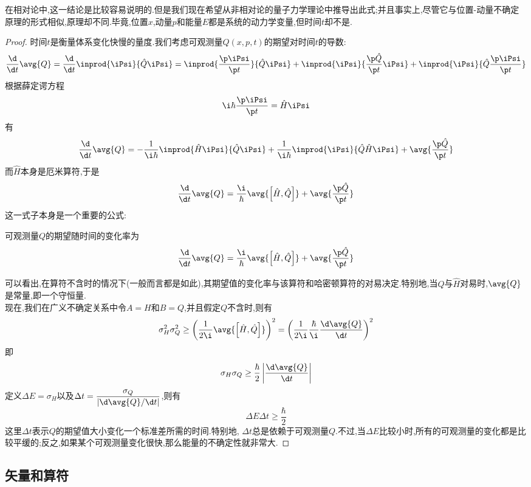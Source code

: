 \documentclass{ctexart}
\begin{document}
在相对论中,这一结论是比较容易说明的.但是我们现在希望从非相对论的量子力学理论中推导出此式;并且事实上,尽管它与位置-动量不确定原理的形式相似,原理却不同.毕竟,位置$x$,动量$p$和能量$E$都是系统的动力学变量,但时间$t$却不是.
\begin{proof}
    时间$t$是衡量体系变化快慢的量度.我们考虑可观测量$Q(x,p,t)$的期望对时间$t$的导数:
    \[\dfrac{\d}{\d t}\avg{Q}=\dfrac{\d}{\d t}\inprod{\iPsi}{\hat{Q}\iPsi}=\inprod{\dfrac{\p\iPsi}{\p t}}{\hat{Q}\iPsi}+\inprod{\iPsi}{\dfrac{\p\hat{Q}}{\p t}\iPsi}+\inprod{\iPsi}{\hat{Q}\dfrac{\p\iPsi}{\p t}}\]
    根据薛定谔方程
    \[\i\hbar\dfrac{\p\iPsi}{\p t}=\hat{H}\iPsi\]
    有
    \[\dfrac{\d}{\d t}\avg{Q}=-\dfrac{1}{\i\hbar}\inprod{\hat{H}\iPsi}{\hat{Q}\iPsi}+\dfrac{1}{\i\hbar}\inprod{\iPsi}{\hat{Q}\hat{H}\iPsi}+\avg{\dfrac{\p\hat{Q}}{\p t}}\]
    而$\hat{H}$本身是厄米算符,于是
    \[\dfrac{\d}{\d t}\avg{Q}=\dfrac{\i}{\hbar}\avg{\left[\hat{H},\hat{Q}\right]}+\avg{\dfrac{\p\hat{Q}}{\p t}}\]
    这一式子本身是一个重要的公式:
    \begin{theorem}[广义埃伦菲斯特定理]
        可观测量$Q$的期望随时间的变化率为
        \[\dfrac{\d}{\d t}\avg{Q}=\dfrac{\i}{\hbar}\avg{\left[\hat{H},\hat{Q}\right]}+\avg{\dfrac{\p\hat{Q}}{\p t}}\]
    \end{theorem}
    可以看出,在算符不含时的情况下(一般而言都是如此),其期望值的变化率与该算符和哈密顿算符的对易决定.特别地,当$\hat{Q}$与$\hat{H}$对易时,$\avg{Q}$是常量,即一个守恒量.\\
    \indent 现在,我们在广义不确定关系中令$A=H$和$B=Q$,并且假定$Q$不含时,则有
    \[\sigma_H^2\sigma_Q^2\geq\left(\dfrac{1}{2\i}\avg{\left[\hat{H},\hat{Q}\right]}\right)^2=\left(\dfrac{1}{2\i}\dfrac{\hbar}{\i}\dfrac{\d\avg{Q}}{\d t}\right)^2\]
    即
    \[\sigma_H\sigma_Q\geq\dfrac{\hbar}{2}\left|\dfrac{\d\avg{Q}}{\d t}\right|\]
    定义$\Delta E=\sigma_H$以及$\Delta t=\dfrac{\sigma_Q}{\left|\d\avg{Q}/\d t\right|}$,则有
    \[\Delta E\Delta t\geq\dfrac{\hbar}{2}\]
    这里$\Delta t$表示$Q$的期望值大小变化一个标准差所需的时间.特别地, $\Delta t$总是依赖于可观测量$Q$.不过,当$\Delta E$比较小时,所有的可观测量的变化都是比较平缓的;反之,如果某个可观测量变化很快,那么能量的不确定性就非常大.
\end{proof}
\subsection{矢量和算符}
\end{document}
